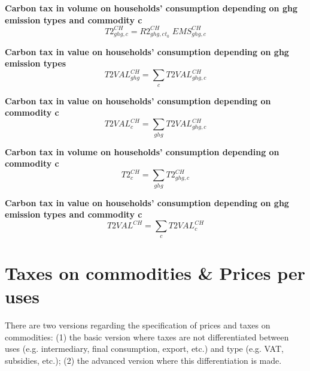 \documentclass[12pt]{article}
\numberwithin{equation}{section}
\begin{document}
\noindent \textbf{Carbon tax in volume on households' consumption depending on ghg emission types and commodity c} 
\begin{dmath}
T2^{CH}_{ghg, c} = R2^{CH}_{ghg, c}_{t_0} \; EMS^{CH}_{ghg, c}
\label{Exception_taxes_prices.mdlT2_CH[ghg,c]}
\end{dmath}

\noindent \textbf{Carbon tax in value on households' consumption depending on ghg emission types} 
\begin{dmath}
T2VAL^{CH}_{ghg} = \sum_{c} T2VAL^{CH}_{ghg, c}
\label{Exception_taxes_prices.mdlT2VAL_CH[ghg]}
\end{dmath}

\noindent \textbf{Carbon tax in value on households' consumption depending on commodity c} 
\begin{dmath}
T2VAL^{CH}_{c} = \sum_{ghg} T2VAL^{CH}_{ghg, c}
\label{Exception_taxes_prices.mdlT2VAL_CH[c]}
\end{dmath}

\noindent \textbf{Carbon tax in volume on households' consumption depending on commodity c} 
\begin{dmath}
T2^{CH}_{c} = \sum_{ghg} T2^{CH}_{ghg, c}
\label{Exception_taxes_prices.mdlT2_CH[c]}
\end{dmath}

\noindent \textbf{Carbon tax in value on households' consumption depending on ghg emission types and commodity c} 
\begin{dmath}
T2VAL^{CH} = \sum_{c} T2VAL^{CH}_{c}
\label{Exception_taxes_prices.mdlT2VAL_CH}
\end{dmath}




\section{ Taxes on commodities \& Prices per uses}



There are two versions regarding the specification of prices and taxes on commodities: (1) the basic version where taxes are not differentiated between uses (e.g. intermediary, final consumption, export, etc.) and type (e.g. VAT, subsidies, etc.); (2) the advanced version where this differentiation is made. \\
\end{document}
